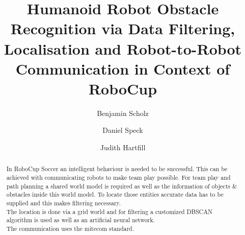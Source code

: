 \documentclass[lnicst,a4paper]{svmultln}
\begin{document}
%
\mainmatter              %
%
\title{Humanoid Robot Obstacle Recognition via Data Filtering, Localisation and Robot-to-Robot Communication in Context of RoboCup} 
%
%
\author{Benjamin Scholz \and Daniel Speck \and Judith Hartfill}
%
%
\tocauthor{}
%

\maketitle              %





\begin{abstract}        %
In RoboCup Soccer an intelligent behaviour is needed to be successful. This can be achieved with communicating robots to make team play possible. For team play and path planning a shared world model is required as well as the information of objects \& obstacles inside this world model. To locate those entities accurate data has to be supplied and this makes filtering necessary.
\\
The location is done via a grid world and for filtering a customized DBSCAN algorithm is used as well as an artificial neural network.
\\
The communication uses the mitecom standard.

\end{abstract}
%
\end{document}
